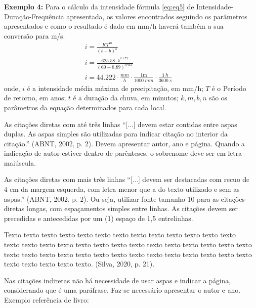 \textbf{Exemplo 4:}
Para o cálculo da intensidade fórmula \eqref{eq:eq5} de Intensidade-Duração-Frequência apresentada, os valores encontrados seguindo os parâmetros apresentados e como o resultado é dado em mm/h haverá também a sua conversão para m/s.
\begin{gather} 
	i = \frac{K T^m}{(t+b)^n}   \label{eq:eq5}  \\[2ex]
		i = \frac{\num{625.58} \cdot 5^{\num{0.171}}  }{(60+\num{8.89})^{\num{0.961}}} \\[2ex]
		i = \num{44.222} \cdot \frac{\si{mm}}{\si{h}} \cdot \frac{1\mathrm{m}}{\SI{1000}{mm}} \cdot \frac{\SI{1}{h}}{\SI{3600}{s}} 	
\end{gather}
\noindent onde, $i$ é a intensidade média máxima de precipitação, em mm/h; $T$ é o Período de retorno, em anos; $t$ é a duração da chuva, em minutos; $k,m,b,n$ são os parâmetros da equação determinados para cada local.


As citações diretas com até três linhas ``[...] devem estar contidas entre aspas duplas. As aspas simples são utilizadas para indicar citação no interior da citação.'' (ABNT, 2002, p. 2). Devem apresentar autor, ano e página. Quando a indicação de autor estiver dentro de parênteses, o sobrenome deve ser em letra maiúscula. 


As citações diretas com mais três linhas ``[...] devem ser destacadas com recuo de 4 cm da margem esquerda, com letra menor que a do texto utilizado e sem as aspas.'' (ABNT, 2002, p. 2). Ou seja, utilizar fonte tamanho 10 para as citações diretas longas, com espaçamentos simples entre linhas. As citações devem ser precedidas e antecedidas por um (1) espaço de 1,5 entrelinhas. 

\begin{citacao}
Texto texto texto texto texto texto texto texto texto texto texto texto texto texto texto texto texto texto texto texto texto texto texto texto texto texto texto texto texto texto texto texto texto texto texto texto texto texto texto texto texto texto texto texto texto texto. (Silva, 2020, p. 21).
\end{citacao}


Nas citações indiretas não há necessidade de usar aspas e indicar a página, considerando que é uma paráfrase. Faz-se necessário apresentar o autor e ano. \\






\noindent Exemplo referência de livro: \cite{exemplo_livro}

